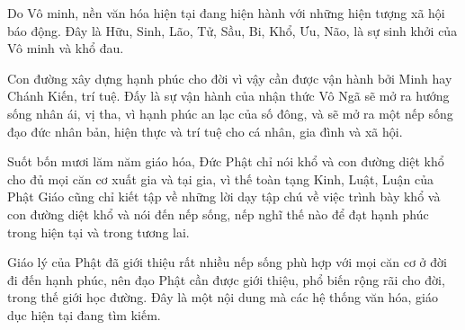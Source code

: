 Do Vô minh, nền văn hóa hiện tại đang hiện hành với những hiện tượng xã hội báo động. Đây là Hữu, Sinh, Lão, Tử, Sầu, Bi, Khổ, Ưu, Não, là sự sinh khởi của Vô minh và khổ đau.

Con đường xây dựng hạnh phúc cho đời vì vậy cần được vận hành bởi Minh hay Chánh Kiến, trí tuệ. Đấy là sự vận hành của nhận thức Vô Ngã sẽ mở ra hướng sống nhân ái, vị tha, vì hạnh phúc an lạc của số đông, và sẽ mở ra một nếp sống đạo đức nhân bản, hiện thực và trí tuệ cho cá nhân, gia đình và xã hội.

Suốt bốn mươi lăm năm giáo hóa, Đức Phật chỉ nói khổ và con đường diệt khổ cho đủ mọi căn cơ xuất gia và tại gia, vì thế toàn tạng Kinh, Luật, Luận của Phật Giáo cũng chỉ kiết tập về những lời dạy tập chú về việc trình bày khổ và con đường diệt khổ và nói đến nếp sống, nếp nghĩ thế nào để đạt hạnh phúc trong hiện tại và trong tương lai.

Giáo lý của Phật đã giới thiệu rất nhiều nếp sống phù hợp với mọi căn cơ ở đời đi đến hạnh phúc, nên đạo Phật cần được giới thiệu, phổ biến rộng rãi cho đời, trong thế giới học đường. Đây là một nội dung mà các hệ thống văn hóa, giáo dục hiện tại đang tìm kiếm.

